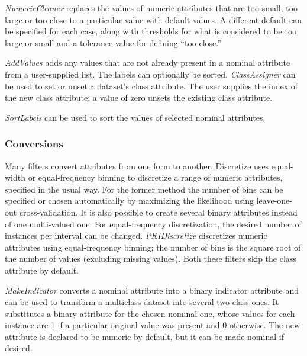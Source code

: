 \textit{NumericCleaner} replaces the values of numeric attributes that are too
small, too large or too close to a particular value with default
values. A different default can be specified for each case, along with
thresholds for what is considered to be too large or small and a
tolerance value for defining ``too close.''

\textit{AddValues} adds any values that are not already present in a
nominal attribute from a user-supplied list. The labels can optionally
be sorted. \textit{ClassAssigner} can be used to set or unset a
dataset's class attribute. The user supplies the index of the new
class attribute; a value of zero unsets the existing class attribute.

\textit{SortLabels} can be used to sort the values of selected nominal
attributes.

\subsubsection{Conversions}

Many filters convert attributes from one form to another. Discretize
uses equal-width or equal-frequency binning to discretize a range of
numeric attributes, specified in the usual way. For the former method
the number of bins can be specified or chosen automatically by
maximizing the likelihood using leave-one-out cross-validation. It is
also possible to create several binary attributes instead of one
multi-valued one. For equal-frequency discretization, the desired
number of instances per interval can be
changed. \textit{PKIDiscretize} discretizes numeric attributes using
equal-frequency binning; the number of bins is the square root of the
number of values (excluding missing values). Both these filters skip
the class attribute by default.

\textit{MakeIndicator} converts a nominal attribute into a binary indicator
attribute and can be used to transform a multiclass dataset into
several two-class ones. It substitutes a binary attribute for the
chosen nominal one, whose values for each instance are 1 if a
particular original value was present and 0 otherwise. The new
attribute is declared to be numeric by default, but it can be made
nominal if desired.


